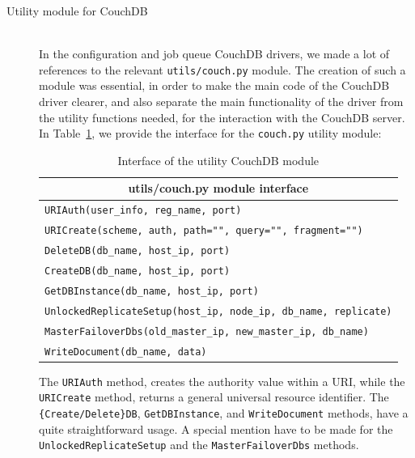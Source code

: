 \begin{description}


  \item[Utility module for CouchDB] \hfill \\
    In the configuration and job queue CouchDB drivers, we made a lot of
    references to the relevant \texttt{utils/couch.py} module. The creation of
    such a module was essential, in order to make the main code of the CouchDB
    driver clearer, and also separate the main functionality of the driver from
    the utility functions needed, for the interaction with the CouchDB server.
    In Table~\ref{tbl:utils}, we provide the interface for the \texttt{couch.py}
    utility module:

    \begin{table}[htbp]
      \begin{center}
      \begin{tabular}{l}
        \hline
        \multicolumn{1}{c}{\textbf{utils/couch.py module interface}} \\
        \hline\hline
        \texttt{URIAuth(user\_info, reg\_name, port)} \\
        \texttt{URICreate(scheme, auth, path="", query="", fragment="")} \\
        \texttt{DeleteDB(db\_name, host\_ip, port)} \\
        \texttt{CreateDB(db\_name, host\_ip, port)} \\
        \texttt{GetDBInstance(db\_name, host\_ip, port)} \\
        \texttt{UnlockedReplicateSetup(host\_ip, node\_ip, db\_name,
            replicate)} \\
        \texttt{MasterFailoverDbs(old\_master\_ip, new\_master\_ip,
            db\_name)} \\
        \texttt{WriteDocument(db\_name, data)} \\
        \hline
      \end{tabular}
      \end{center}
      \caption{Interface of the utility CouchDB module
        \label{tbl:utils}}
    \end{table}

    The \texttt{URIAuth} method, creates the authority value within a URI, while
    the \texttt{URICreate} method, returns a general universal resource
    identifier. The \texttt{\{Create/Delete\}DB}, \texttt{GetDBInstance}, and
    \texttt{WriteDocument} methods, have a quite straightforward usage.
    A special mention have to be made for the \texttt{UnlockedReplicateSetup}
    and the \texttt{MasterFailoverDbs} methods.


\end{description}

